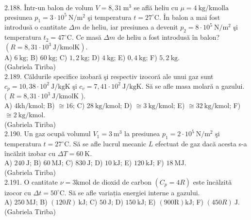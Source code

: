 2.188. Într-un balon de volum $V=8,31 \mathrm{~m}^{3}$ se află heliu cu $\mu=4 \mathrm{~kg} / \mathrm{kmol} \mathrm{la}$ presiunea $p_{1}=3 \cdot 10^{5} \mathrm{~N} / \mathrm{m}^{2}$ şi temperatura $t=27^{\circ} \mathrm{C}$. În balon a mai fost introdusă o cantitate $\Delta m$ de heliu, iar presiunea a devenit $p_{2}=8 \cdot 10^{5} \mathrm{~N} / \mathrm{m}^{2}$ şi temperatura $t_{2}=47^{\circ} \mathrm{C}$. Ce masă $\Delta m$ de heliu a fost introdusă în balon? $\left(R=8,31 \cdot 10^{3} \mathrm{~J} / \mathrm{kmol} \mathrm{K}\right)$.\\ A) $6 \mathrm{~kg}$; B) $60 \mathrm{~kg}$; C) $1,2 \mathrm{~kg}$; D) $4 \mathrm{~kg}$; E) $0,4 \mathrm{~kg}$; F) $5,2 \mathrm{~kg}$.\\ (Gabriela Tiriba)\\

2.189. Căldurile specifice izobară şi respectiv izocoră ale unui gaz sunt $c_{p}=10,38 \cdot 10^{2} \mathrm{~J} / \mathrm{kgK}$ şi $c_{v}=7,41 \cdot 10^{2} \mathrm{~J} / \mathrm{kgK}$. Să se afle masa molară a gazului. ( $R=8,31 \cdot 10^{3} \mathrm{~J} / \mathrm{kmolK}$ ).\\ A) $4 \mathrm{kh} / \mathrm{kmol}$; B) $\cong 16$; C) $28 \mathrm{~kg} / \mathrm{kmol}$; D) $\cong 3 \mathrm{~kg} / \mathrm{kmol}$; E) $\cong 32 \mathrm{~kg} / \mathrm{kmol}$; F) $\cong 2 \mathrm{~kg} / \mathrm{kmol}$.\\ (Gabriela Tiriba)\\

2.190. Un gaz ocupă volumul $V_{1}=3 \mathrm{~m}^{3}$ la presiunea $p_{1}=2 \cdot 10^{5} \mathrm{~N} / \mathrm{m}^{2}$ şi temperatura $t=27^{\circ} \mathrm{C}$. Să se afle lucrul mecanic $L$ efectuat de gaz dacă acesta s-a încălzit izobar cu $\Delta T=60 \mathrm{~K}$.\\ A) $240 \mathrm{~J}$; B) $60 \mathrm{~MJ}$; C) $830 \mathrm{~J}$; D) $10 \mathrm{~kJ}$; E) $120 \mathrm{~kJ}$; F) $18 \mathrm{~MJ}$.\\ (Gabriela Tiriba)\\

2.191. O cantitate $\nu=3 \mathrm{kmol}$ de dioxid de carbon $\left(C_{p}=4 R\right)$ este încălzită izocor cu $\Delta t=50^{\circ} \mathrm{C}$. Să se afle variația energiei interne a gazului.\\ A) $250 \mathrm{~MJ}$; B) $( 120 R ) \mathrm{~kJ}$; C) $50 \mathrm{~J}$; D) $150 \mathrm{~kJ}$; E) $(900 \mathrm{R}) \mathrm{kJ}$; F) $( 450 R ) \mathrm{~J}$.\\ (Gabriela Tiriba)\\

